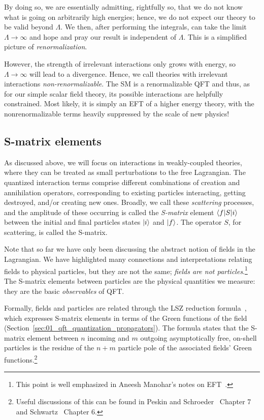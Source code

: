 By doing so, we are essentially admitting, rightfully so, that we do not know what is going on arbitrarily high energies; hence, we do not expect our theory to be valid beyond $\Lambda$.
We then, after performing the integrals, can take the limit $\Lambda \rightarrow \infty$ and hope and pray our result is independent of $\Lambda$.
This is a simplified picture of \textit{renormalization}.

However, the strength of irrelevant interactions only grows with energy, so $\Lambda \rightarrow \infty$ will lead to a divergence.
Hence, we call theories with irrelevant interactions \textit{non-renormalizable}.
The SM is a renormalizable QFT and thus, as for our simple scalar field theory, its possible interactions are helpfully constrained.
Most likely, it is simply an EFT of a higher energy theory, with the nonrenormalizable terms heavily suppressed by the scale of new physics!

\subsection{S-matrix elements}
\label{sec:01_qft_interactions_smatrix}

As discussed above, we will focus on interactions in weakly-coupled theories, where they can be treated as small perturbations to the free Lagrangian.
The quantized interaction terms comprise different combinations of creation and annihilation operators, corresponding to existing particles interacting, getting destroyed, and/or creating new ones.
Broadly, we call these \textit{scattering} processes, and the amplitude of these occurring is called the \textit{S-matrix} element $\braket{f|S|i}$ between the initial and final particles states $\ket{i}$ and $\ket{f}$.
The operator $S$, for scattering, is called the S-matrix.

Note that so far we have only been discussing the abstract notion of fields in the Lagrangian.
We have highlighted many connections and interpretations relating fields to physical particles, but they are not the same; \textit{fields are not particles}.\footnote{This point is well emphasized in Aneesh Manohar's notes on EFT~\cite{Manohar:2018aog}.}
The S-matrix elements between particles are the physical quantities we measure: they are the basic \textit{observables} of QFT.

Formally, fields and particles are related through the LSZ reduction formula~\cite{Lehmann:1954rq}, which expresses S-matrix elements in terms of the Green functions of the field (Section~\ref{sec:01_qft_quantization_propagators}).
The formula states that the S-matrix element between $n$ incoming and $m$ outgoing asymptotically free, on-shell particles is the residue of the $n+m$ particle pole of the associated fields' Green functions.\footnote{Useful discussions of this can be found in Peskin and Schroeder~\cite{Peskin:1995ev} Chapter 7 and Schwartz~\cite{Schwartz:2014sze} Chapter 6.}

